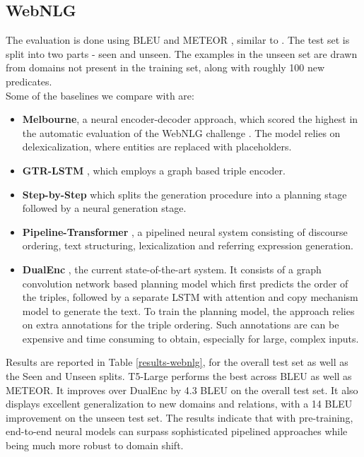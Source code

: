 \documentclass[11pt,a4paper]{article}
\begin{document}
\subsection{WebNLG}
The evaluation is done using BLEU and METEOR \cite{lavie2007meteor}, similar to \cite{ferreira2019neural}. The test set is split into two parts - seen and unseen. The examples in the unseen set are drawn from domains not present in the training set, along with roughly 100 new predicates. \\
Some of the baselines we compare with are:
\begin{itemize}
    \item \textbf{Melbourne}, a neural encoder-decoder approach, which scored the highest in the automatic evaluation of the WebNLG challenge \cite{gardent2017webnlg}. The model relies on delexicalization, where entities are replaced with placeholders.
    \item \textbf{GTR-LSTM} \cite{distiawan2018gtr}, which employs a graph based triple encoder.
    \item \textbf{Step-by-Step} \cite{moryossef2019step} which splits the generation procedure into a planning stage followed by a neural generation stage.
    \item \textbf{Pipeline-Transformer} \cite{ferreira2019neural}, a pipelined neural system consisting of discourse ordering, text structuring, lexicalization and referring expression generation. 
    \item \textbf{DualEnc} \cite{zhao2020bridging}, the current state-of-the-art system. It consists of a graph convolution network based planning model which first predicts the order of the triples, followed by a separate LSTM with attention and copy mechanism model to generate the text. To train the planning model, the approach relies on extra annotations for the triple ordering. Such annotations are can be expensive and time consuming to obtain, especially for large, complex inputs. 
\end{itemize}
\par Results are reported in Table \ref{results-webnlg}, for the overall test set as well as the Seen and Unseen splits. T5-Large performs the best across BLEU as well as METEOR. It improves over DualEnc by 4.3 BLEU on the overall test set. It also displays excellent generalization to new domains and relations, with a 14 BLEU improvement on the unseen test set. The results indicate that with pre-training, end-to-end neural models can surpass sophisticated pipelined approaches while being much more robust to domain shift.
\end{document}
